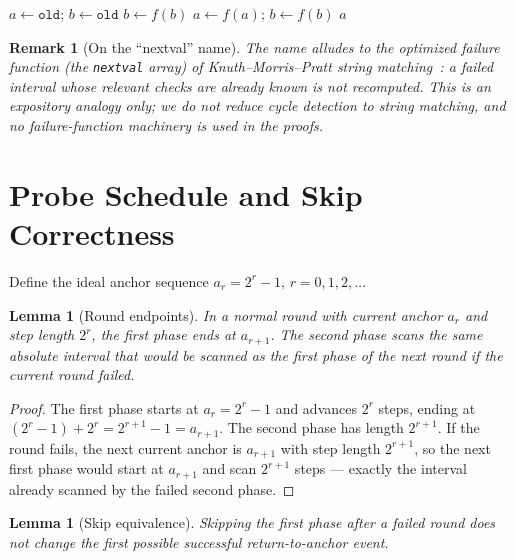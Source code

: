\documentclass[11pt]{article}
\newtheorem{lemma}[theorem]{Lemma}
\newtheorem{remark}[theorem]{Remark}
\newcommand{\oldc}{\texttt{old}}
\begin{document}
\begin{algorithm}[p]
\footnotesize
\caption{\textsc{LocateEntry}$(\oldc,\lambda)$ --- recover the entry given $\lambda$}
\label{alg:locate}
\begin{algorithmic}[1]
\State \(a\gets \oldc\); \(b\gets \oldc\)
 \State \(b\gets f(b)\) \EndFor
{} \State \(a\gets f(a)\); \(b\gets f(b)\) \EndWhile
\State \Return \(a\)
\end{algorithmic}
\end{algorithm}

\begin{remark}[On the ``nextval'' name]
The name alludes to the optimized failure function (the \texttt{nextval} array)
of Knuth--Morris--Pratt string matching~\cite{kmp1977}: a failed interval whose
relevant checks are already known is not recomputed. This is an expository
analogy only; we do not reduce cycle detection to string matching, and no
failure-function machinery is used in the proofs.
\end{remark}

\section{Probe Schedule and Skip Correctness}
\label{sec:schedule}

Define the ideal anchor sequence $a_r=2^r-1$, $r=0,1,2,\dots$

\begin{lemma}[Round endpoints]
\label{lem:endpoints}
In a normal round with current anchor $a_r$ and step length $2^r$, the first
phase ends at $a_{r+1}$. The second phase scans the same absolute interval that
would be scanned as the first phase of the next round if the current round
failed.
\end{lemma}

\begin{proof}
The first phase starts at $a_r=2^r-1$ and advances $2^r$ steps, ending at
$(2^r-1)+2^r=2^{r+1}-1=a_{r+1}$. The second phase has length $2^{r+1}$. If the
round fails, the next current anchor is $a_{r+1}$ with step length $2^{r+1}$, so
the next first phase would start at $a_{r+1}$ and scan $2^{r+1}$ steps --- exactly
the interval already scanned by the failed second phase.
\end{proof}

\begin{lemma}[Skip equivalence]
\label{lem:skip}
Skipping the first phase after a failed round does not change the first possible
successful return-to-anchor event.
\end{lemma}
\end{document}
